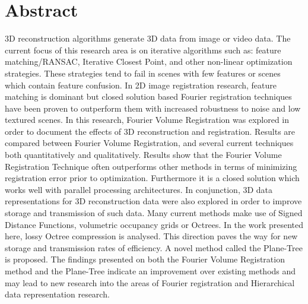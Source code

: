 \makeatletter
\chapter{Abstract}

3D reconstruction algorithms generate 3D data from image or video data. The current focus of this research area is on iterative algorithms such as: feature matching/RANSAC, Iterative Closest Point, and other non-linear optimization strategies. These strategies tend to fail in scenes with few features or scenes which contain feature confusion. In 2D image registration research, feature matching is dominant but closed solution based Fourier registration techniques have been proven to outperform them with increased robustness to noise and low textured scenes. In this research, Fourier Volume Registration was explored in order to document the effects of 3D reconstruction and registration. Results are compared between Fourier Volume Registration, and several current techniques both quantitatively and qualitatively. Results show that the Fourier Volume Registration Technique often outperforms other methods in terms of minimizing registration error prior to optimization. Furthermore it is a closed solution which works well with parallel processing architectures. In conjunction, 3D data representations for 3D reconstruction data were also explored in order to improve storage and transmission of such data. Many current methods make use of Signed Distance Functions, volumetric occupancy grids or Octrees. In the work presented here, lossy Octree compression is analysed. This direction paves the way for new storage and transmission rates of efficiency. A novel method called the Plane-Tree is proposed. The findings presented on both the Fourier Volume Registration method and the Plane-Tree indicate an improvement over existing methods and may lead to new research into the areas of Fourier registration and Hierarchical data representation research.


